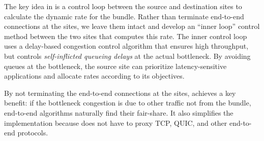 
The key idea in \name is a control loop between the source and destination sites to calculate the dynamic rate for the bundle. Rather than terminate end-to-end connections at the sites, we leave them intact and develop an ``inner loop'' control method between the two sites that computes this rate. The inner control loop uses a delay-based congestion control algorithm that ensures high throughput, but controls {\em self-inflicted queueing delays} at the actual bottleneck. By avoiding queues at the bottleneck, the source site can prioritize latency-sensitive applications and allocate rates according to its objectives.

By not terminating the end-to-end connections at the sites, \name{} achieves a key benefit: if the bottleneck congestion is due to other traffic not from the bundle, end-to-end algorithms naturally find their fair-share. It also simplifies the implementation because \name{} does not have to proxy TCP, QUIC, and other end-to-end protocols.






